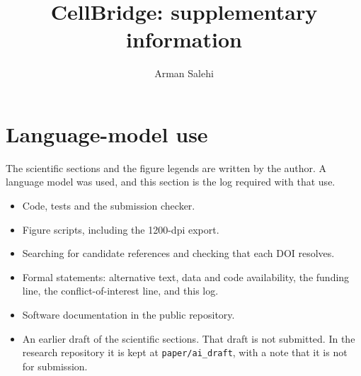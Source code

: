 \documentclass[unnumsec,webpdf,contemporary,large,namedate]{oup-authoring-template}
\begin{document}

\title[CellBridge supplement]{CellBridge: supplementary information}

\author[1]{Arman Salehi}

\address[1]{, , }




\maketitle

\section{Language-model use}
\label{sec:ai-log}

The scientific sections and the figure legends are written by the author. A language model was used, and this section is the log required with that use.

\begin{itemize}
\item Code, tests and the submission checker.
\item Figure scripts, including the 1200-dpi export.
\item Searching for candidate references and checking that each DOI resolves.
\item Formal statements: alternative text, data and code availability, the funding line, the conflict-of-interest line, and this log.
\item Software documentation in the public repository.
\item An earlier draft of the scientific sections. That draft is not submitted. In the research repository it is kept at \texttt{paper/ai\_draft}, with a note that it is not for submission.
\end{itemize}
\end{document}
